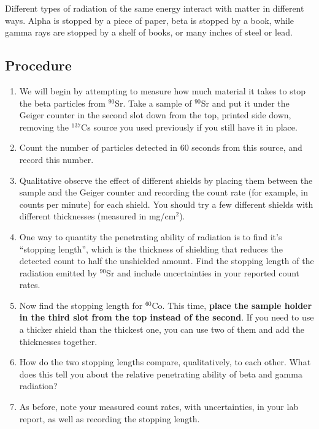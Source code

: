 Different types of radiation of the same energy interact with matter in different ways.
Alpha is stopped by a piece of paper, beta is stopped by a book, while gamma rays are stopped by a shelf of books, or many inches of steel or lead.

\subsection{Procedure}

\begin{enumerate}
	\item We will begin by attempting to measure how much material it takes to stop the beta particles from $^{90}$Sr.
	Take a sample of $^{90}$Sr and put it under the Geiger counter in the second slot down from the top, printed side down, removing the $^{137}$Cs source you used previously if you still have it in place.
	
	\item Count the number of particles detected in 60 seconds from this source, and record this number.
	
	\item Qualitative observe the effect of different shields by placing them between the sample and the Geiger counter and recording the count rate (for example, in counts per minute) for each shield.
	You should try a few different shields with different thicknesses (measured in mg/cm$^2$).
	
	\item One way to quantity the penetrating ability of radiation is to find it's ``stopping length'', which is the thickness of shielding that reduces the detected count to half the unshielded amount. Find the stopping length of the radiation emitted by $^{90}$Sr and include uncertainties in your reported count rates.

	\item Now find the stopping length for $^{60}$Co. This time, \textbf{place the sample holder in the third slot from the top instead of the second}. If you need to use a thicker shield than the thickest one, you can use two of them and add the thicknesses together.
	
	\item How do the two stopping lengths compare, qualitatively, to each other. What does this tell you about the relative penetrating ability of beta and gamma radiation?
	
	\item As before, note your measured count rates, with uncertainties, in your lab report, as well as recording the stopping length.
	

\end{enumerate}
